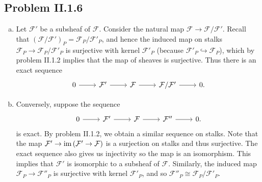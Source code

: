 \documentclass{mathnotes}
\begin{document}
\subsection*{Problem II.1.6}
\begin{enumerate}[(a)]
    \item Let $\mathcal{F}'$ be a subsheaf of $\mathcal{F}$. Consider the natural map $\mathcal{F}\to\mathcal{F}/\mathcal{F}'$.
        Recall that $(\mathcal{F}/\mathcal{F}')_P=\mathcal{F}_P/\mathcal{F}'_P$, and hence the induced map on stalks
        $\mathcal{F}_P\to\mathcal{F}_P/\mathcal{F}'_P$ is surjective with kernel $\mathcal{F}'_P$ (because
        $\mathcal{F}'_P\hookrightarrow\mathcal{F}_P$), which by problem II.1.2 implies that the map of sheaves is surjective.
        Thus there is an exact sequence
        \begin{equation*}
            \begin{tikzcd}
                0\ar{r} & \mathcal{F}'\ar{r} & \mathcal{F}\ar{r} & \mathcal{F}/\mathcal{F}'\ar{r} & 0.
            \end{tikzcd}
        \end{equation*}
    \item Conversely, suppose the sequence
        \begin{equation*}
            \begin{tikzcd}
                0\ar{r} & \mathcal{F}'\ar{r} & \mathcal{F}\ar{r} & \mathcal{F}''\ar{r} & 0.
            \end{tikzcd}
        \end{equation*}
        is exact. By problem II.1.2, we obtain a similar sequence on stalks. Note that the map
        $\mathcal{F}'\to\operatorname{im}\left(\mathcal{F}'\to\mathcal{F}\right)$ is a surjection on stalks and thus surjective.
        The exact sequence also gives us injectivity so the map is an isomorphism. This implies
        that $\mathcal{F}'$ is isomorphic to a subsheaf of $\mathcal{F}$.
        Similarly, the induced map $\mathcal{F}_P\to\mathcal{F}''_P$ is surjective with kernel $\mathcal{F}'_P$,
        and so $\mathcal{F}''_P\cong \mathcal{F}_P/\mathcal{F}'_P$.
\end{enumerate}
\end{document}
